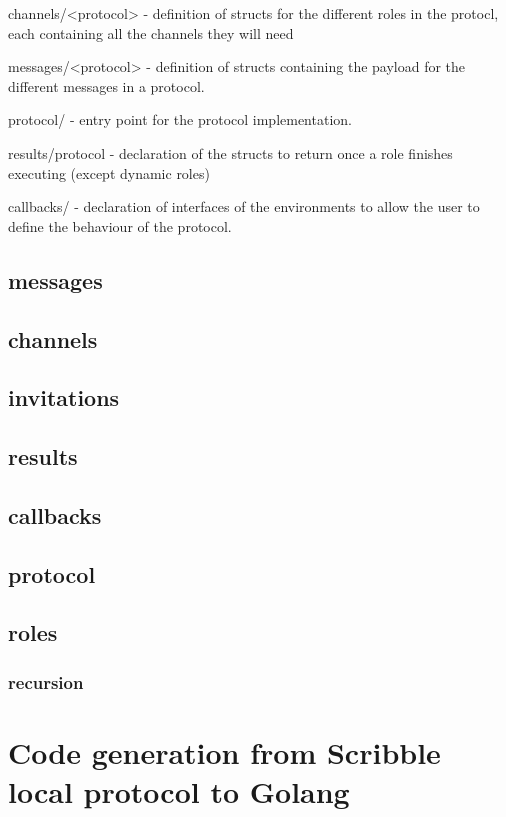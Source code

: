 \documentclass[12pt,twoside]{report}
\begin{document}
channels/<protocol> - definition of structs for the different roles in the protocl, each containing all the channels they will need 

messages/<protocol> - definition of structs containing the payload for the different messages in a protocol.

protocol/ - entry point for the protocol implementation.

results/protocol - declaration of the structs to return once a role finishes executing (except dynamic roles)

callbacks/ - declaration of interfaces of the environments to allow the user to define the behaviour of the protocol.


\subsection{messages}
\subsection{channels}
\subsection{invitations}
\subsection{results}
\subsection{callbacks}
\subsection{protocol}\label{entry-point}
\subsection{roles}
\subsubsection{recursion}
    

\section{Code generation from Scribble local protocol to Golang}\label{local-protocol-codegen}
\end{document}
